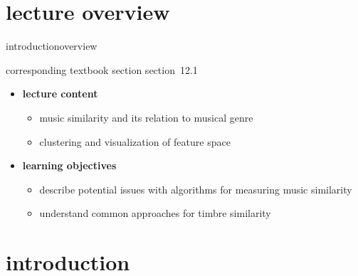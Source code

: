 


\subtitle{Module 12.1: Music Similarity}


	

    \section[overview]{lecture overview}
        \begin{frame}{introduction}{overview}
            \begin{block}{corresponding textbook section}
                    section~12.1
            \end{block}

            \begin{itemize}
                \item   \textbf{lecture content}
                    \begin{itemize}
                        \item   music similarity and its relation to musical genre
                        \item   clustering and visualization of feature space
                    \end{itemize}
                \bigskip
                \item<2->   \textbf{learning objectives}
                    \begin{itemize}
                        \item   describe potential issues with algorithms for measuring music similarity
                        \item   understand common approaches for timbre similarity
                    \end{itemize}
            \end{itemize}
        \end{frame}

    \section[intro]{introduction}


